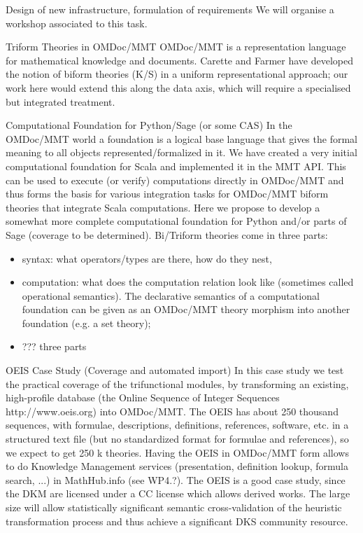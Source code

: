 \begin{Workpackage}{\thewpno}
\begin{task}{Design of new infrastructure, formulation of requirements}
We will organise a workshop associated to this task.
\end{task}

\begin{task}{Triform Theories in OMDoc/MMT}
\label{task:data_triform}
OMDoc/MMT is a representation language for mathematical knowledge and documents. Carette and Farmer have developed the notion of biform theories (K/S) in a uniform representational approach; our work here would extend this along the data axis, which will require a specialised but integrated treatment.
\end{task}

\begin{task}{Computational Foundation for Python/Sage (or some CAS)}
\label{task:data_foundationCAS}
In the OMDoc/MMT world a foundation is a logical base language that gives the formal meaning to all objects represented/formalized in it. We have created a very initial computational foundation for Scala and implemented it in the MMT API. This can be used to execute (or verify) computations directly in OMDoc/MMT and thus forms the basis for various integration tasks for OMDoc/MMT biform theories that integrate Scala computations. Here we propose to develop a somewhat more complete computational foundation for Python and/or parts of Sage (coverage to be determined). Bi/Triform theories come in three parts:
\begin{itemize}
\item syntax: what operators/types are there, how do they nest, 
\item computation:  what does the computation relation look like (sometimes called operational semantics). The declarative semantics of a computational foundation can be given as an OMDoc/MMT theory morphism into another foundation (e.g. a set theory);
\item ??? three parts
\end{itemize}
\end{task}

\begin{task}{OEIS Case Study (Coverage and automated import)}
\label{task:data_OEIS}
In this case study we test the practical coverage of the trifunctional modules, by transforming an existing, high-profile database (the Online Sequence of Integer Sequences http://www.oeis.org) into OMDoc/MMT. The OEIS has about 250 thousand sequences, with formulae, descriptions, definitions, references, software, etc. in a structured text file (but no standardized format for formulae and references), so we expect to get 250 k theories. Having the OEIS in OMDoc/MMT form allows to do Knowledge Management services (presentation, definition lookup, formula search, ...) in MathHub.info (see WP4.?). The OEIS is a good case study, since the DKM  are licensed under a CC license which allows derived works. The large size will allow statistically significant semantic cross-validation of the heuristic transformation process and thus achieve a significant DKS community resource.
\end{task}


\end{Workpackage}
